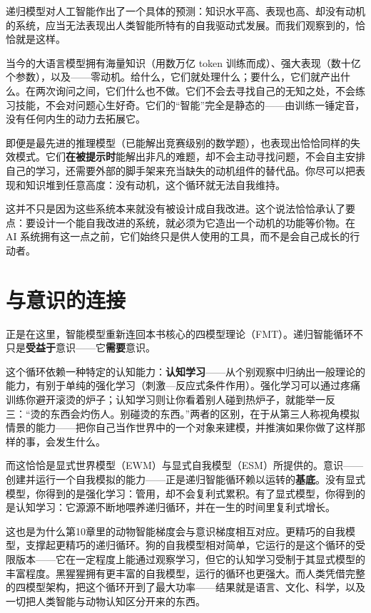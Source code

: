 \documentclass[11pt, twoside, openright]{book}
\begin{document}
递归模型对人工智能作出了一个具体的预测：知识水平高、表现也高、却没有动机的系统，应当无法表现出人类智能所特有的自我驱动式发展。而我们观察到的，恰恰就是这样。

当今的大语言模型拥有海量知识（用数万亿 token 训练而成）、强大表现（数十亿个参数），以及------零动机。给什么，它们就处理什么；要什么，它们就产出什么。在两次询问之间，它们什么也不做。它们不会去寻找自己的无知之处，不会练习技能，不会对问题心生好奇。它们的“智能”完全是静态的------由训练一锤定音，没有任何内生的动力去拓展它。

即便是最先进的推理模型（已能解出竞赛级别的数学题），也表现出恰恰同样的失效模式。它们\textbf{在被提示时}能解出非凡的难题，却不会主动寻找问题，不会自主安排自己的学习，还需要外部的脚手架来充当缺失的动机组件的替代品。你尽可以把表现和知识堆到任意高度：没有动机，这个循环就无法自我维持。

这并不只是因为这些系统本来就没有被设计成自我改进。这个说法恰恰承认了要点：要设计一个能自我改进的系统，就必须为它造出一个动机的功能等价物。在 AI 系统拥有这一点之前，它们始终只是供人使用的工具，而不是会自己成长的行动者。

\section*{与意识的连接}

正是在这里，智能模型重新连回本书核心的四模型理论（FMT）。递归智能循环不只是\textbf{受益于}意识------它\textbf{需要}意识。

这个循环依赖一种特定的认知能力：\textbf{认知学习}------从个别观察中归纳出一般理论的能力，有别于单纯的强化学习（刺激---反应式条件作用）。强化学习可以通过疼痛训练你避开滚烫的炉子；认知学习则让你看着别人碰到热炉子，就能举一反三：“烫的东西会灼伤人。别碰烫的东西。”两者的区别，在于从第三人称视角模拟情景的能力------把你自己当作世界中的一个对象来建模，并推演如果你做了这样那样的事，会发生什么。

而这恰恰是显式世界模型（EWM）与显式自我模型（ESM）所提供的。意识------创建并运行一个自我模拟的能力------正是递归智能循环赖以运转的\textbf{基底}。没有显式模型，你得到的是强化学习：管用，却不会复利式累积。有了显式模型，你得到的是认知学习：它源源不断地喂养递归循环，并在一生的时间里复利式增长。

这也是为什么第10章里的动物智能梯度会与意识梯度相互对应。更精巧的自我模型，支撑起更精巧的递归循环。狗的自我模型相对简单，它运行的是这个循环的受限版本------它在一定程度上能通过观察学习，但它的认知学习受制于其显式模型的丰富程度。黑猩猩拥有更丰富的自我模型，运行的循环也更强大。而人类凭借完整的四模型架构，把这个循环开到了最大功率------结果就是语言、文化、科学，以及一切把人类智能与动物认知区分开来的东西。
\end{document}
